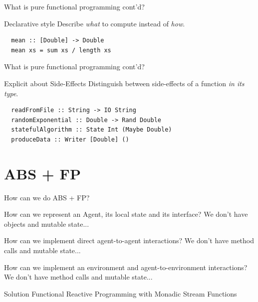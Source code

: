 \documentclass{beamer} %
\begin{document}
\begin{frame}[fragile]{What is pure functional programming cont'd?}
  \begin{block}{Declarative style}
  	Describe \textit{what} to compute instead of \textit{how}.
  \end{block}
  
  \begin{block}{}
  \begin{verbatim}
  mean :: [Double] -> Double
  mean xs = sum xs / length xs
  \end{verbatim}
  \end{block}
\end{frame}
 
\begin{frame}[fragile]{What is pure functional programming cont'd?}
  \begin{block}{Explicit about Side-Effects}
  	Distinguish between side-effects of a function \textit{in its type}.
  \end{block}
  
  \begin{block}{}
  \begin{verbatim}
  readFromFile :: String -> IO String
  randomExponential :: Double -> Rand Double
  statefulAlgorithm :: State Int (Maybe Double)
  produceData :: Writer [Double] ()
  \end{verbatim}
  \end{block}
\end{frame}

\section{ABS + FP}
\begin{frame}{How can we do ABS + FP?}
  \begin{block}{How can we represent an Agent, its local state and its interface?}
	We don't have objects and mutable state...
  \end{block}
  
  \begin{block}{How can we implement direct agent-to-agent interactions?}
	We don't have method calls and mutable state...
  \end{block}
  
  \begin{block}{How can we implement an environment and agent-to-environment interactions?}
	We don't have method calls and mutable state...
  \end{block}
  
  \begin{block}{Solution}
  	Functional Reactive Programming with Monadic Stream Functions
  \end{block}
\end{frame}
\end{document}
